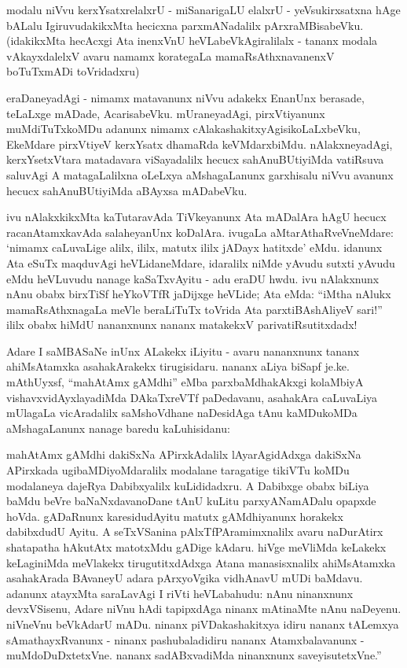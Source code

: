 modalu niVvu kerxYsatxrelalxrU - miSanarigaLU elalxrU - yeVsukirxsatxna hAge bALalu IgiruvudakikxMta hecicxna parxmANadalilx pArxraMBisabeVku. (idakikxMta hecAcxgi Ata inenxVnU heVLabeVkAgiralilalx - tananx modala vAkayxdalelxV avaru namamx korategaLa mamaRsAthxnavanenxV boTuTxmADi toVridadxru)

eraDaneyadAgi - nimamx matavanunx niVvu adakekx EnanUnx berasade, teLaLxge mADade, AcarisabeVku. mUraneyadAgi, pirxVtiyanunx muMdiTuTxkoMDu adanunx nimamx cAlakashakitxyAgisikoLaLxbeVku, EkeMdare pirxVtiyeV kerxYsatx dhamaRda keVMdarxbiMdu. nAlakxneyadAgi, kerxYsetxVtara matadavara viSayadalilx hecucx sahAnuBUtiyiMda vatiRsuva saluvAgi A matagaLalilxna oLeLxya aMshagaLanunx garxhisalu niVvu avanunx hecucx sahAnuBUtiyiMda aBAyxsa mADabeVku.

ivu nAlakxkikxMta kaTutaravAda TiVkeyanunx Ata mADalAra hAgU hecucx racanAtamxkavAda salaheyanUnx koDalAra. ivugaLa aMtarAthaRveVneMdare: `nimamx caLuvaLige alilx, ililx, matutx ililx jADayx hatitxde' eMdu. idanunx Ata eSuTx maqduvAgi heVLidaneMdare, idaralilx niMde yAvudu sutxti yAvudu eMdu heVLuvudu nanage kaSaTxvAyitu - adu eraDU hwdu. ivu nAlakxnunx nAnu obabx birxTiSf heYkoVTfR jaDijxge heVLide; Ata eMda: ``iMtha nAlukx mamaRsAthxnagaLa meVle beraLiTuTx toVrida Ata parxtiBAshAliyeV sari!'' ililx obabx hiMdU nananxnunx nananx matakekxV parivatiRsutitxdadx!

Adare I saMBASaNe inUnx ALakekx iLiyitu - avaru nananxnunx tananx ahiMsAtamxka asahakArakekx tirugisidaru. nananx aLiya biSapf je.ke. mAthUyxsf, ``mahAtAmx gAMdhi'' eMba parxbaMdhakAkxgi kolaMbiyA vishavxvidAyxlayadiMda DAkaTxreVTf paDedavanu, asahakAra caLuvaLiya mUlagaLa vicAradalilx saMshoVdhane naDesidAga tAnu kaMDukoMDa aMshagaLanunx nanage baredu kaLuhisidanu: 

\begin{minipage}[c]{1cm}
\quad
\end{minipage}
\begin{minipage}[c]{8.5cm}
mahAtAmx gAMdhi dakiSxNa APirxkAdalilx lAyarAgidAdxga dakiSxNa APirxkada ugibaMDiyoMdaralilx modalane taragatige tikiVTu koMDu modalaneya dajeRya Dabibxyalilx kuLididadxru. A Dabibxge obabx biLiya baMdu beVre baNaNxdavanoDane tAnU kuLitu parxyANamADalu opapxde hoVda. gADaRnunx karesidudAyitu matutx gAMdhiyanunx horakekx dabibxdudU Ayitu. A seTxVSanina pAlxTfPAramimxnalilx avaru naDurAtirx shatapatha hAkutAtx matotxMdu gADige kAdaru. hiVge meVliMda keLakekx keLaginiMda meVlakekx tirugutitxdAdxga Atana manasisxnalilx ahiMsAtamxka asahakArada BAvaneyU adara pArxyoVgika vidhAnavU mUDi baMdavu. adanunx atayxMta saraLavAgi I riVti heVLabahudu: nAnu ninanxnunx devxVSisenu, Adare niVnu hAdi tapipxdAga ninanx mAtinaMte nAnu naDeyenu. niVneVnu beVkAdarU mADu. ninanx piVDakashakitxya idiru nananx tALemxya sAmathayxRvanunx - ninanx pashubaladidiru nananx Atamxbalavanunx - muMdoDuDxtetxVne. nananx sadABxvadiMda ninanxnunx saveyisutetxVne.''
\end{minipage}

